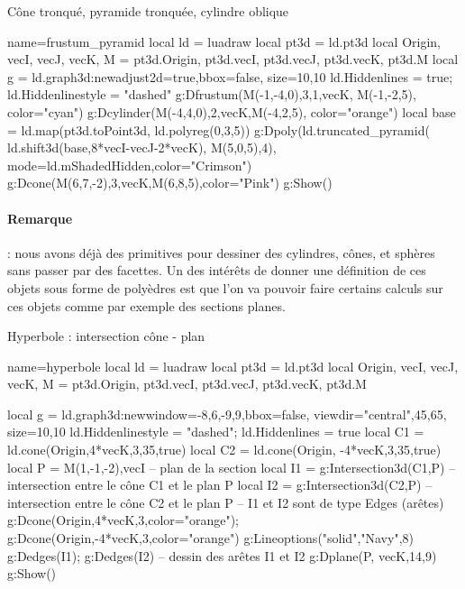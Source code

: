 \begin{demo}{Cône tronqué, pyramide tronquée, cylindre oblique}
\begin{luadraw}{name=frustum_pyramid}
local ld = luadraw
local pt3d = ld.pt3d
local Origin, vecI, vecJ, vecK, M = pt3d.Origin, pt3d.vecI, pt3d.vecJ, pt3d.vecK, pt3d.M
local g = ld.graph3d:new{adjust2d=true,bbox=false, size={10,10} }
ld.Hiddenlines = true; ld.Hiddenlinestyle = "dashed"
g:Dfrustum(M(-1,-4,0),3,1,vecK, M(-1,-2,5), {color="cyan"})
g:Dcylinder(M(-4,4,0),2,vecK,M(-4,2,5), {color="orange"})
local base = ld.map(pt3d.toPoint3d, ld.polyreg(0,3,5))
g:Dpoly(ld.truncated_pyramid( ld.shift3d(base,8*vecI-vecJ-2*vecK), M(5,0,5),4),
    {mode=ld.mShadedHidden,color="Crimson"})
g:Dcone(M(6,7,-2),3,vecK,M(6,8,5),{color="Pink"})
g:Show()
\end{luadraw}
\end{demo}

\paragraph{Remarque} : nous avons déjà des primitives pour dessiner des cylindres, cônes, et sphères sans passer par des facettes. Un des intérêts de donner une définition de ces objets sous forme de polyèdres est que l'on va pouvoir faire certains calculs sur ces objets comme par exemple des sections planes.

\begin{demo}{Hyperbole : intersection cône - plan}
\begin{luadraw}{name=hyperbole}
local ld = luadraw
local pt3d = ld.pt3d
local Origin, vecI, vecJ, vecK, M = pt3d.Origin, pt3d.vecI, pt3d.vecJ, pt3d.vecK, pt3d.M

local g = ld.graph3d:new{window={-8,6,-9,9},bbox=false, 
    viewdir={"central",45,65}, size={10,10}}
ld.Hiddenlinestyle = "dashed"; ld.Hiddenlines = true
local C1 = ld.cone(Origin,4*vecK,3,35,true)
local C2 = ld.cone(Origin, -4*vecK,3,35,true)
local P = {M(1,-1,-2),vecI} -- plan de la section
local I1 = g:Intersection3d(C1,P) -- intersection entre le cône C1 et le plan P
local I2 = g:Intersection3d(C2,P) -- intersection entre le cône C2 et le plan P
-- I1 et I2 sont de type Edges (arêtes)
g:Dcone(Origin,4*vecK,3,{color="orange"}); g:Dcone(Origin,-4*vecK,3,{color="orange"})
g:Lineoptions("solid","Navy",8)
g:Dedges(I1); g:Dedges(I2) -- dessin des arêtes I1 et I2
g:Dplane(P, vecK,14,9)
g:Show()
\end{luadraw}
\end{demo}

